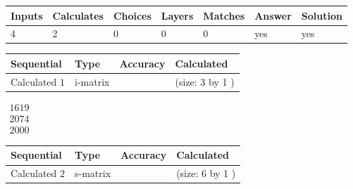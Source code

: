 \documentclass[12pt]{article}
\begin{document}
 
 
\noindent{}
 
 

 
 
 
\noindent{}
 
 

 
 
\noindent{}
 
 

 
\vspace{0.3in}
   
   
   
   
\noindent\begin{tabular}{|l|l|l|l|l|l|l|}
 \hline
Inputs & Calculates & Choices & Layers & Matches & Answer & Solution \\ \hline
           4  & 
           2  & 
           0
  & 
           0  & 
           0  & 
  yes & 
  yes 
  \\ \hline
 \end{tabular}
   
   
   
   
\noindent{}
   
   
  
  
\noindent\begin{tabular}{|l|l|l|l|}
\hline
 Sequential & Type & Accuracy & Calculated \\ 
\hline
 
 
  Calculated $            1 $ & i-matrix &  & 
 (size:            3  by            1 )
 \\  \hline  
 \end{tabular}
   
   
$\begin{array}{
 c
 }
        1619  \\ 
        2074  \\ 
        2000
 \end{array}  $ 
  
  
\noindent\begin{tabular}{|l|l|l|l|}
\hline
 Sequential & Type & Accuracy & Calculated \\ 
\hline
 
 
  Calculated $            2 $ & s-matrix & & 
 (size:            6  by            1 )
 \\  \hline  
 \end{tabular}
   
\end{document}
